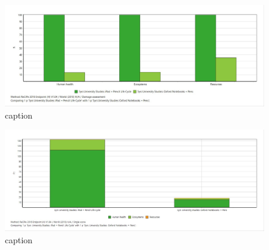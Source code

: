 \begin{figure}[H]
    \centering
    \includegraphics[width=\textwidth]{images/RES_100/Damage_Assessment_RES_100.JPG}
    \caption{caption}\label{fig:damage_assessment_RES_100}
\end{figure}

\begin{figure}[H]
    \centering
    \includegraphics[width=\textwidth]{images/RES_100/Single_Score_RES_100.JPG}
    \caption{caption}\label{fig:single_score_RES100}
\end{figure}